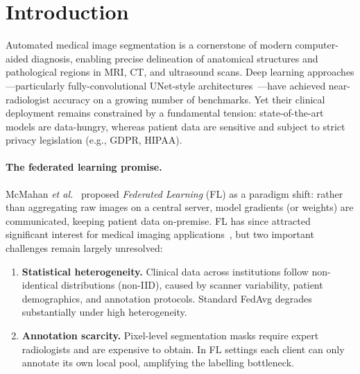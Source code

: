 \section{Introduction}
\label{sec:introduction}

Automated medical image segmentation is a cornerstone of modern
computer-aided diagnosis, enabling precise delineation of anatomical
structures and pathological regions in MRI, CT, and ultrasound scans.
Deep learning approaches---particularly fully-convolutional
UNet-style architectures~\cite{ronneberger2015unet}---have achieved
near-radiologist accuracy on a growing number of benchmarks.
Yet their clinical deployment remains constrained by a fundamental
tension: state-of-the-art models are data-hungry, whereas patient data
are sensitive and subject to strict privacy legislation (e.g.,
GDPR, HIPAA).

\paragraph{The federated learning promise.}
McMahan \emph{et al.}~\cite{mcmahan2017fedavg} proposed \emph{Federated
Learning} (FL) as a paradigm shift: rather than aggregating raw images on a
central server, model gradients (or weights) are communicated, keeping
patient data on-premise.
FL has since attracted significant interest for medical imaging
applications~\cite{sheller2018federated,nvidia2019clara,bercea2022federated,liu2024fedfms,skorupko2025fednnunet},
but two important challenges remain largely unresolved:

\begin{enumerate}
  \item \textbf{Statistical heterogeneity.}
    Clinical data across institutions follow non-identical distributions
    (non-IID), caused by scanner variability, patient demographics, and
    annotation protocols.
    Standard FedAvg degrades substantially under high heterogeneity.
  \item \textbf{Annotation scarcity.}
    Pixel-level segmentation masks require expert radiologists and are
    expensive to obtain.
    In FL settings each client can only annotate its own local pool,
    amplifying the labelling bottleneck.
\end{enumerate}

